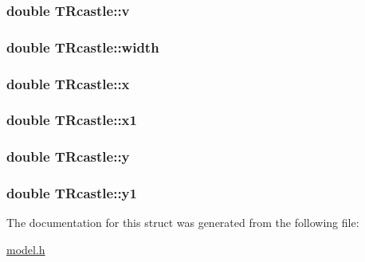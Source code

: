 \subsubsection[{\texorpdfstring{v}{v}}]{\setlength{\rightskip}{0pt plus 5cm}double T\+Rcastle\+::v}\hypertarget{struct_t_rcastle_a35cd1c80d382fcf153c8ce5a55676642}{}\label{struct_t_rcastle_a35cd1c80d382fcf153c8ce5a55676642}
\subsubsection[{\texorpdfstring{width}{width}}]{\setlength{\rightskip}{0pt plus 5cm}double T\+Rcastle\+::width}\hypertarget{struct_t_rcastle_a070133588b3ceb37881590fc42f6a3d1}{}\label{struct_t_rcastle_a070133588b3ceb37881590fc42f6a3d1}
\subsubsection[{\texorpdfstring{x}{x}}]{\setlength{\rightskip}{0pt plus 5cm}double T\+Rcastle\+::x}\hypertarget{struct_t_rcastle_abda3f6ca289399c054e4c5eda9651122}{}\label{struct_t_rcastle_abda3f6ca289399c054e4c5eda9651122}
\subsubsection[{\texorpdfstring{x1}{x1}}]{\setlength{\rightskip}{0pt plus 5cm}double T\+Rcastle\+::x1}\hypertarget{struct_t_rcastle_a2284c30dfba99adf368dfa5a2f3b7bed}{}\label{struct_t_rcastle_a2284c30dfba99adf368dfa5a2f3b7bed}
\subsubsection[{\texorpdfstring{y}{y}}]{\setlength{\rightskip}{0pt plus 5cm}double T\+Rcastle\+::y}\hypertarget{struct_t_rcastle_a04e7abedc910e08ebf0fecac129d96c7}{}\label{struct_t_rcastle_a04e7abedc910e08ebf0fecac129d96c7}
\subsubsection[{\texorpdfstring{y1}{y1}}]{\setlength{\rightskip}{0pt plus 5cm}double T\+Rcastle\+::y1}\hypertarget{struct_t_rcastle_a560becdf5bd4c0ce143f3490ebefc341}{}\label{struct_t_rcastle_a560becdf5bd4c0ce143f3490ebefc341}


The documentation for this struct was generated from the following file\+:\begin{DoxyCompactItemize}
\item 
\hyperlink{model_8h}{model.\+h}\end{DoxyCompactItemize}
